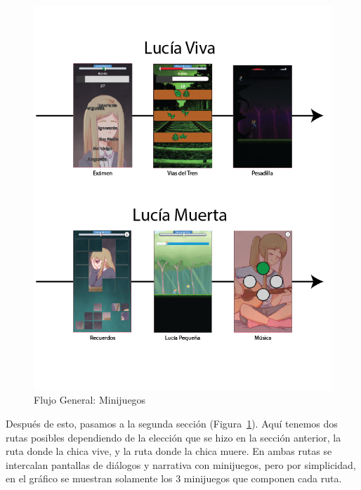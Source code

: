 \begin{figure}[h!]
    \centering
    \includegraphics[scale=0.7]{imgs/general-chart-2.png}
    \caption{Flujo General: Minijuegos}
    \label{fig:chart-2}
\end{figure}

Después de esto, pasamos a la segunda sección (Figura~\ref{fig:chart-2}). Aquí tenemos dos rutas posibles dependiendo de la elección que se hizo en la sección anterior, la ruta donde la chica vive, y la ruta donde la chica muere. En ambas rutas se intercalan pantallas de diálogos y narrativa con minijuegos, pero por simplicidad, en el gráfico se muestran solamente los 3 minijuegos que componen cada ruta.

